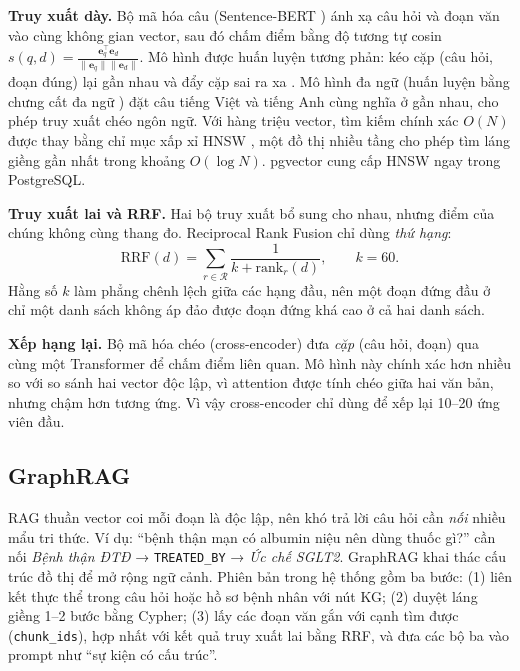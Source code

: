 \textbf{Truy xuất dày.} Bộ mã hóa câu (Sentence-BERT \cite{reimers2019}) ánh xạ câu hỏi và đoạn văn vào cùng không gian vector, sau đó chấm điểm bằng độ tương tự cosin $s(q,d)=\frac{\mathbf e_q^\top\mathbf e_d}{\|\mathbf e_q\|\|\mathbf e_d\|}$. Mô hình được huấn luyện tương phản: kéo cặp (câu hỏi, đoạn đúng) lại gần nhau và đẩy cặp sai ra xa \cite{karpukhin2020}. Mô hình đa ngữ (huấn luyện bằng chưng cất đa ngữ \cite{reimers2020}) đặt câu tiếng Việt và tiếng Anh cùng nghĩa ở gần nhau, cho phép truy xuất chéo ngôn ngữ. Với hàng triệu vector, tìm kiếm chính xác $O(N)$ được thay bằng chỉ mục xấp xỉ HNSW \cite{malkov2018}, một đồ thị nhiều tầng cho phép tìm láng giềng gần nhất trong khoảng $O(\log N)$. pgvector \cite{pgvector} cung cấp HNSW ngay trong PostgreSQL.

\textbf{Truy xuất lai và RRF.} Hai bộ truy xuất bổ sung cho nhau, nhưng điểm của chúng không cùng thang đo. Reciprocal Rank Fusion \cite{cormack2009} chỉ dùng \emph{thứ hạng}:
\begin{equation}
\mathrm{RRF}(d) = \sum_{r\in\mathcal R}\frac{1}{k + \mathrm{rank}_r(d)},\qquad k = 60 .
\label{eq:rrf}
\end{equation}
Hằng số $k$ làm phẳng chênh lệch giữa các hạng đầu, nên một đoạn đứng đầu ở chỉ một danh sách không áp đảo được đoạn đứng khá cao ở cả hai danh sách.

\textbf{Xếp hạng lại.} Bộ mã hóa chéo (cross-encoder) \cite{nogueira2019} đưa \emph{cặp} (câu hỏi, đoạn) qua cùng một Transformer để chấm điểm liên quan. Mô hình này chính xác hơn nhiều so với so sánh hai vector độc lập, vì attention được tính chéo giữa hai văn bản, nhưng chậm hơn tương ứng. Vì vậy cross-encoder chỉ dùng để xếp lại 10–20 ứng viên đầu.

\subsection{GraphRAG}

RAG thuần vector coi mỗi đoạn là độc lập, nên khó trả lời câu hỏi cần \emph{nối} nhiều mẩu tri thức. Ví dụ: ``bệnh thận mạn có albumin niệu nên dùng thuốc gì?'' cần nối \emph{Bệnh thận ĐTĐ} → \texttt{TREATED\_BY} → \emph{Ức chế SGLT2}. GraphRAG \cite{edge2024graphrag} khai thác cấu trúc đồ thị để mở rộng ngữ cảnh. Phiên bản trong hệ thống gồm ba bước: (1) liên kết thực thể trong câu hỏi hoặc hồ sơ bệnh nhân với nút KG; (2) duyệt láng giềng 1–2 bước bằng Cypher; (3) lấy các đoạn văn gắn với cạnh tìm được (\texttt{chunk\_ids}), hợp nhất với kết quả truy xuất lai bằng RRF, và đưa các bộ ba vào prompt như ``sự kiện có cấu trúc''.

